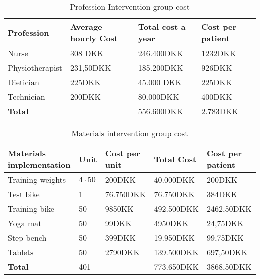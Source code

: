 \begin{table}[H]
\begin{longtabu} to 
    \textbf{Profession} & \textbf{Average hourly Cost} & \textbf{Total cost a year} & \textbf{Cost per patient} \\[-1ex]
    \midrule
     Nurse   &    308 DKK & 246.400DKK & 1232DKK \\ \hline
    Physiotherapist   &   231,50DKK  & 185.200DKK & 926DKK \\ \hline
    Dietician   &  225DKK &    45.000 DKK    & 225DKK \\ \hline
    Technician & 200DKK & 80.000DKK & 400DKK \\
    \hline \hline \hline
    \textbf{Total} & & 556.600DKK & 2.783DKK
    \newline
   \end{longtabu}
\caption{Profession Intervention group cost}
\label{tab: PI}
\end{table}


\begin{table}[H]
\begin{longtabu} to 
    \textbf{Materials implementation} & \textbf{Unit} & \textbf{Cost per unit}&\textbf{Total Cost} & \textbf{Cost per patient} \\[-1ex]
    \midrule
    Training weights   &  $4\cdot50$ & 200DKK&  40.000DKK & 200DKK \\ \hline
    Test bike   & 1 & 76.750DKK & 76.750DKK & 384DKK  \\ \hline
    Training bike & 50 & 9850KK& 492.500DKK & 2462,50DKK \\ \hline
    Yoga mat   &  50 & 99DKK& 4950DKK &   24,75DKK \\ \hline 
    Step bench    &  50 & 399DKK & 19.950DKK  &   99,75DKK  \\ \hline 
    Tablets   &  50 & 2790DKK& 139.500DKK  &   697,50DKK\\ 
    \hline \hline \hline
    \textbf{Total} & 401 &  & 773.650DKK & 3868,50DKK
    \newline
   \end{longtabu}
\caption{Materials intervention group cost}
\label{tab: MI}
\end{table}

